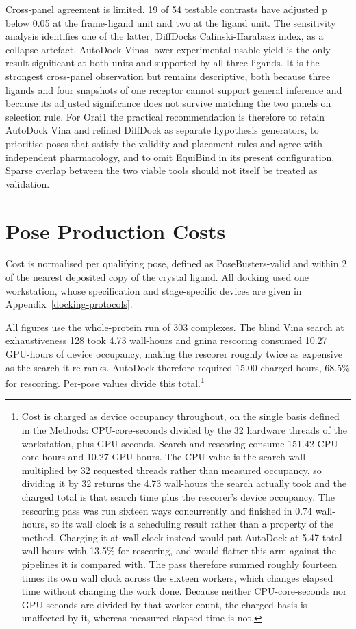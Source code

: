 Cross-panel agreement is limited. 19 of 54 testable contrasts have adjusted p below 0.05 at the frame-ligand unit and two at the ligand unit. The sensitivity analysis identifies one of the latter, DiffDock\textquotesingle s Calinski-Harabasz index, as a collapse artefact. AutoDock Vina\textquotesingle s lower experimental usable yield is the only result significant at both units and supported by all three ligands. It is the strongest cross-panel observation but remains descriptive, both because three ligands and four snapshots of one receptor cannot support general inference and because its adjusted significance does not survive matching the two panels on selection rule. For Orai1 the practical recommendation is therefore to retain AutoDock Vina and refined DiffDock as separate hypothesis generators, to prioritise poses that satisfy the validity and placement rules and agree with independent pharmacology, and to omit EquiBind in its present configuration. Sparse overlap between the two viable tools should not itself be treated as validation.

\hypertarget{pose-production-costs}{%
\section{Pose Production Costs}\label{pose-production-costs}}

Cost is normalised per qualifying pose, defined as PoseBusters-valid and within 2\angstrom{} of the nearest deposited copy of the crystal ligand. All docking used one workstation, whose specification and stage-specific devices are given in Appendix~\ref{docking-protocols}.

All figures use the whole-protein run of 303 complexes. The blind Vina search at exhaustiveness 128 took 4.73 wall-hours and gnina rescoring consumed 10.27 GPU-hours of device occupancy, making the rescorer roughly twice as expensive as the search it re-ranks. AutoDock therefore required 15.00 charged hours, 68.5\% for rescoring. Per-pose values divide this total.\footnote{Cost is charged as device occupancy throughout, on the single basis defined in the Methods: CPU-core-seconds divided by the 32 hardware threads of the workstation, plus GPU-seconds. Search and rescoring consume 151.42 CPU-core-hours and 10.27 GPU-hours. The CPU value is the search wall multiplied by 32 requested threads rather than measured occupancy, so dividing it by 32 returns the 4.73 wall-hours the search actually took and the charged total is that search time plus the rescorer's device occupancy. The rescoring pass was run sixteen ways concurrently and finished in 0.74 wall-hours, so its wall clock is a scheduling result rather than a property of the method. Charging it at wall clock instead would put AutoDock at 5.47 total wall-hours with 13.5\% for rescoring, and would flatter this arm against the pipelines it is compared with. The pass therefore summed roughly fourteen times its own wall clock across the sixteen workers, which changes elapsed time without changing the work done. Because neither CPU-core-seconds nor GPU-seconds are divided by that worker count, the charged basis is unaffected by it, whereas measured elapsed time is not.}

